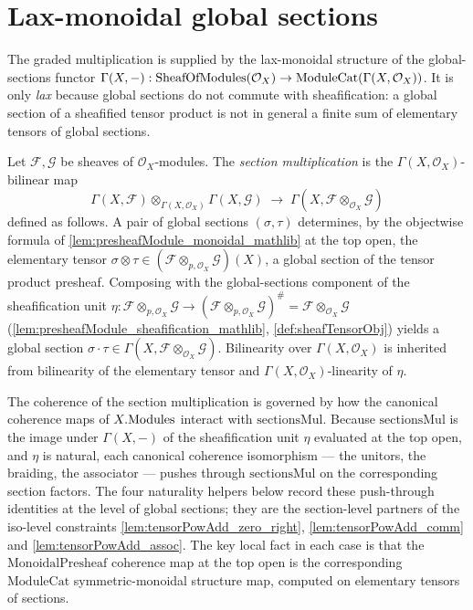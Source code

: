 \section{Lax-monoidal global sections}
\label{sec:sgr_lax_sections}

The graded multiplication is supplied by the lax-monoidal structure of the
global-sections functor \(\Gamma(X, -) : \mathrm{SheafOfModules}(\mathcal{O}_X) \to
\mathrm{ModuleCat}(\Gamma(X, \mathcal{O}_X))\). It is only \emph{lax} because
global sections do not commute with sheafification: a global section of a
sheafified tensor product is not in general a finite sum of elementary tensors of
global sections.

\begin{definition}
  \label{def:sectionMul}
  Let \(\mathcal{F}, \mathcal{G}\) be sheaves of \(\mathcal{O}_X\)-modules. The
  \emph{section multiplication} is the \(\Gamma(X,\mathcal{O}_X)\)-bilinear map
  \[
    \Gamma(X, \mathcal{F}) \otimes_{\Gamma(X,\mathcal{O}_X)}
      \Gamma(X, \mathcal{G})
    \;\longrightarrow\;
    \Gamma(X, \mathcal{F} \otimes_{\mathcal{O}_X} \mathcal{G})
  \]
  defined as follows. A pair of global sections \((\sigma, \tau)\) determines,
  by the objectwise formula of \cref{lem:presheafModule_monoidal_mathlib} at the
  top open, the elementary tensor \(\sigma \otimes \tau \in
  (\mathcal{F} \otimes_{p,\mathcal{O}_X} \mathcal{G})(X)\), a global section of
  the tensor product presheaf. Composing with the global-sections component of
  the sheafification unit
  \(\eta : \mathcal{F} \otimes_{p,\mathcal{O}_X} \mathcal{G} \to
  (\mathcal{F} \otimes_{p,\mathcal{O}_X} \mathcal{G})^{\#} =
  \mathcal{F} \otimes_{\mathcal{O}_X} \mathcal{G}\)
  (\cref{lem:presheafModule_sheafification_mathlib},
  \cref{def:sheafTensorObj}) yields a global section
  \(\sigma \cdot \tau \in
  \Gamma(X, \mathcal{F} \otimes_{\mathcal{O}_X} \mathcal{G})\). Bilinearity over
  \(\Gamma(X,\mathcal{O}_X)\) is inherited from bilinearity of the elementary
  tensor and \(\Gamma(X,\mathcal{O}_X)\)-linearity of \(\eta\).
\end{definition}

The coherence of the section multiplication is governed by how the canonical
coherence maps of \(X.\mathrm{Modules}\) interact with \(\mathrm{sectionsMul}\). Because
\(\mathrm{sectionsMul}\) is the image under \(\Gamma(X,-)\) of the sheafification
unit \(\eta\) evaluated at the top open, and \(\eta\) is natural, each canonical
coherence isomorphism --- the unitors, the braiding, the associator --- pushes
through \(\mathrm{sectionsMul}\) on the corresponding section factors. The four
naturality helpers below record these push-through identities at the level of
global sections; they are the section-level partners of the iso-level constraints
\cref{lem:tensorPowAdd_zero_right}, \cref{lem:tensorPowAdd_comm} and
\cref{lem:tensorPowAdd_assoc}. The key local fact in each case is that the
\(\mathrm{MonoidalPresheaf}\) coherence map at the top open is the corresponding
\(\mathrm{ModuleCat}\) symmetric-monoidal structure map, computed on elementary
tensors of sections.

